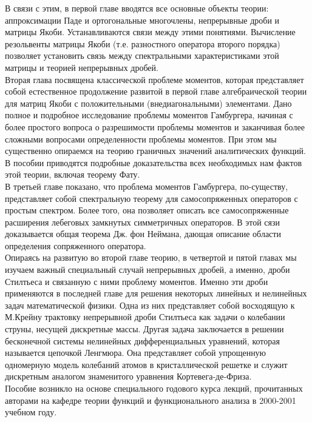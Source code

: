 \documentclass[12 pt, a4 paper]{article}
\theoremstyle{plain}   \newtheorem{Pro}{Задача}
\begin{document}
В связи с этим, в первой главе вводятся все основные объекты
теории: аппроксимации Паде и ортогональные многочлены, непрерывные
дроби и матрицы Якоби. Устанавливаются связи между этими понятиями.
Вычисление резольвенты матрицы Якоби (т.е. разностного оператора
второго порядка) позволяет установить связь между спектральными
характеристиками этой матрицы и теорией непрерывных дробей. \\

Вторая глава посвящена классической проблеме моментов, которая
представляет собой естественное продолжение развитой в первой
главе алгебраической теории для матриц Якоби с положительными
(внедиагональными) элементами.
Дано полное и подробное исследование проблемы моментов Гамбургера,
начиная с более простого вопроса о разрешимости проблемы моментов
и заканчивая более сложными вопросами определенности проблемы моментов.
При этом мы существенно опираемся на теорию граничных значений
аналитических функций. В пособии приводятся подробные доказательства
всех необходимых нам фактов этой теории, включая теорему Фату. \\

В третьей главе показано, что проблема моментов Гамбургера,
по-существу, представляет собой спектральную теорему для самосопряженных
операторов с простым спектром. Более того, она позволяет описать
все самосопряженные расширения лебеговых замкнутых симметричных
операторов. В этой сязи доказывается общая теорема Дж. фон Неймана,
дающая описание области определения сопряженного оператора. \\

Опираясь на развитую во второй главе теорию, в четвертой и
пятой главах мы изучаем
важный специальный случай непрерывных дробей, а именно, дроби
Стилтьеса и связанную с ними проблему моментов.
Именно эти дроби применяются в последней главе для решения
некоторых линейных и нелинейных задач математической физики.
Одна из них представляет собой восходящую к М.Крейну трактовку
непрерывной дроби Стилтьеса как задачи о колебании струны,
несущей дискретные массы.
Другая задача заключается в решении бесконечной системы нелинейных
дифференциальных уравнений, которая называется цепочкой Ленгмюра.
Она представляет собой упрощенную одномерную модель колебаний
атомов в кристаллической решетке и служит дискретным аналогом
знаменитого уравнения Кортевега-де-Фриза. \\

Пособие возникло на основе специального годового курса лекций,
прочитанных авторами на кафедре теории функций и функционального
анализа в 2000-2001 учебном году. \\
\end{document}
